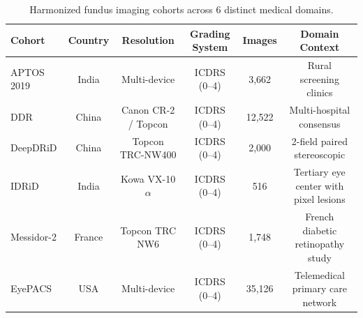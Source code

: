 \begin{table}[htbp]
\centering
\caption{Harmonized fundus imaging cohorts across 6 distinct medical domains.}
\label{tab:cohort_composition}
\small
\begin{tabular}{lccccc}
\toprule
\textbf{Cohort} & \textbf{Country} & \textbf{Resolution} & \textbf{Grading System} & \textbf{Images} & \textbf{Domain Context} \\
\midrule
APTOS 2019 & India & Multi-device & ICDRS (0--4) & 3,662 & Rural screening clinics \\
DDR & China & Canon CR-2 / Topcon & ICDRS (0--4) & 12,522 & Multi-hospital consensus \\
DeepDRiD & China & Topcon TRC-NW400 & ICDRS (0--4) & 2,000 & 2-field paired stereoscopic \\
IDRiD & India & Kowa VX-10$\alpha$ & ICDRS (0--4) & 516 & Tertiary eye center with pixel lesions \\
Messidor-2 & France & Topcon TRC NW6 & ICDRS (0--4) & 1,748 & French diabetic retinopathy study \\
EyePACS & USA & Multi-device & ICDRS (0--4) & 35,126 & Telemedical primary care network \\
\bottomrule
\end{tabular}
\end{table}
